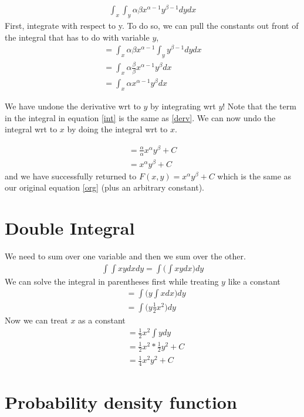 \documentclass{article}
\begin{document}
\begin{align}
    \int_x \int_y \alpha \beta x^{\alpha -1} y^{\beta - 1} dy dx
\end{align}
First, integrate with respect to y. To do so, we can pull the constants out front of the integral that has to do with variable $y$,
\begin{align}
   = \int_x \alpha \beta x^{\alpha -1}\int_y  y^{\beta - 1} dy dx\\
   = \int_x \alpha \frac{\beta}{\beta} x^{\alpha -1} y^\beta dx\\
   = \int_x \alpha x^{\alpha -1} y^\beta dx \label{int}
\end{align}

We have undone the derivative wrt to $y$ by integrating wrt $y$! Note that the term in the integral in equation \ref{int} is the same as \ref{derv}. We can now undo the integral wrt to $x$ by doing the integral wrt to $x$. 

\begin{align}
    = \frac{\alpha}{\alpha} x^\alpha y^\beta + C\\
    = x^\alpha y^\beta + C
\end{align}
and we have successfully returned to $F(x,y) = x^\alpha y^\beta +C$ which is the same as our original equation \ref{org} (plus an arbitrary constant).

\section{Double Integral}
We need to sum over one variable and then we sum over the other.
\begin{align}
    \int \int xy dx dy = \int \bigg(\int xy dx\bigg) dy 
\end{align}
We can solve the integral in parentheses first while treating $y$ like a constant 
\begin{align}
    &= \int \bigg( y\int x dx\bigg) dy \\
    &= \int \bigg( y\frac{1}{2} x^2 \bigg) dy
\end{align}
Now we can treat $x$ as a constant
\begin{align}
    &= \frac{1}{2} x^2 \int y dy\\
    & = \frac{1}{2} x^2 * \frac{1}{2} y^2 + C\\
    &= \frac{1}{4} x^2 y^2 + C
\end{align}

\section{Probability density function}
\end{document}
